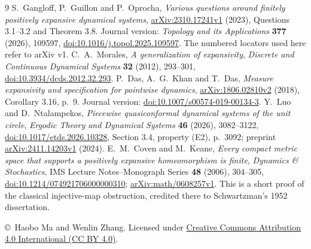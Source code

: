 \documentclass[11pt]{article}
\begin{document}
\begin{thebibliography}{9}
 S.~Gangloff, P.~Guillon and P.~Oprocha,
\emph{Various questions around finitely positively expansive dynamical systems},
\href{https://arxiv.org/abs/2310.17241v1}{arXiv:2310.17241v1} (2023), Questions 3.1--3.2 and Theorem 3.8.
Journal version: \emph{Topology and its Applications} \textbf{377} (2026), 109597,
\href{https://doi.org/10.1016/j.topol.2025.109597}{doi:10.1016/j.topol.2025.109597}.
The numbered locators used here refer to arXiv v1.
 C.~A.~Morales, \emph{A generalization of expansivity},
\emph{Discrete and Continuous Dynamical Systems} \textbf{32} (2012), 293--301,
\href{https://doi.org/10.3934/dcds.2012.32.293}{doi:10.3934/dcds.2012.32.293}.
 P.~Das, A.~G.~Khan and T.~Das,
\emph{Measure expansivity and specification for pointwise dynamics},
\href{https://arxiv.org/abs/1806.02810v2}{arXiv:1806.02810v2} (2018), Corollary 3.16, p.~9.
Journal version: \href{https://doi.org/10.1007/s00574-019-00134-3}{doi:10.1007/s00574-019-00134-3}.
 Y.~Luo and D.~Ntalampekos,
\emph{Piecewise quasiconformal dynamical systems of the unit circle},
\emph{Ergodic Theory and Dynamical Systems} \textbf{46} (2026), 3082--3122,
\href{https://doi.org/10.1017/etds.2026.10328}{doi:10.1017/etds.2026.10328},
Section 3.4, property (E2), p.~3092; preprint
\href{https://arxiv.org/abs/2411.14203v1}{arXiv:2411.14203v1} (2024).
 E.~M.~Coven and M.~Keane,
\emph{Every compact metric space that supports a positively expansive
homeomorphism is finite}, \emph{Dynamics \& Stochastics},
IMS Lecture Notes--Monograph Series \textbf{48} (2006), 304--305,
\href{https://doi.org/10.1214/074921706000000310}{doi:10.1214/074921706000000310};
\href{https://arxiv.org/abs/math/0608257v1}{arXiv:math/0608257v1}.
This is a short proof of the classical injective-map obstruction, credited
there to Schwartzman's 1952 dissertation.
\end{thebibliography}
\smallskip
\noindent\small\copyright\ Haobo Ma and Wenlin Zhang.
Licensed under \href{https://creativecommons.org/licenses/by/4.0/}{Creative Commons Attribution 4.0 International (CC BY 4.0)}.
\end{document}
